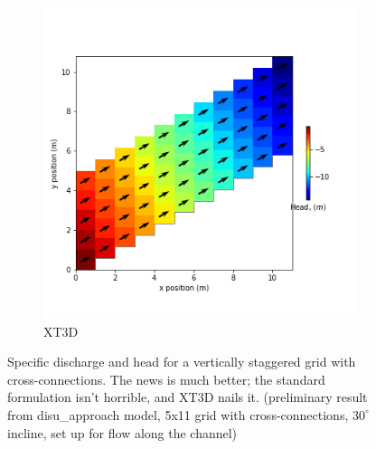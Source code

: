 \documentclass{article}
\begin{document}
\begin{figure}[H]
\begin{subfigure}{0.4\textwidth}
	\includegraphics[width=\textwidth]{../figures/disu-af-vs-x-head.png}
	\caption{XT3D}
	\label{fig:disu-x-cc-head}
\end{subfigure}
\caption{Specific discharge and head for a vertically staggered grid with cross-connections. The news is much better; the standard formulation isn't horrible, and XT3D nails it. (preliminary result from disu\_approach model, 5x11 grid with cross-connections, $30^{\circ}$ incline, set up for flow along the channel)}
\label{fig:figures}
\end{figure}
\end{document}
